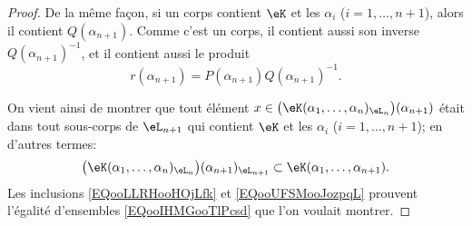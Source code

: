 \begin{proof}
        De la même façon, si un corps contient \( \eK\) et les \( \alpha_i\)  (\( i=1,\ldots, n+1\)), alors il contient \( Q(\alpha_{n+1})\). Comme c'est un corps, il contient aussi son inverse \( Q(\alpha_{n+1})^{-1}\), et il contient aussi le produit
            \begin{equation}
                r(\alpha_{n+1})=P(\alpha_{n+1})Q(\alpha_{n+1})^{-1}.
            \end{equation}

On vient ainsi de montrer que tout élément \( x \in  \big( \eK(\alpha_1,\ldots, \alpha_n)_{\eL_n} \big)(\alpha_{n+1})\) était dans tout sous-corps de \( \eL_{n+1} \) qui contient \( \eK \) et les \( \alpha_i\)  (\( i=1,\ldots, n+1\)); en d'autres termes:
    \begin{equation}\label{EQooUFSMooJozpqL}
       \big( \eK(\alpha_1,\ldots, \alpha_n)_{\eL_n} \big)(\alpha_{n+1})_{\eL_{n+1}} \subset \eK(\alpha_1,\ldots,\alpha_{n+1}).
    \end{equation}
    Les inclusions \eqref{EQooLLRHooHOjLfk} et \ref{EQooUFSMooJozpqL} prouvent l'égalité d'ensembles \eqref{EQooIHMGooTlPcsd} que l'on voulait montrer.
\end{proof}

